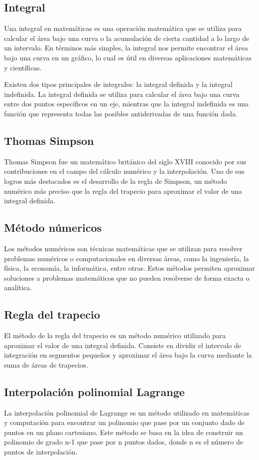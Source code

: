 \subsection{Integral}
Una integral en matemáticas es una operación matemática que se utiliza para calcular el área bajo una curva o la acumulación de cierta cantidad a lo largo de un intervalo. En términos más simples, la integral nos permite encontrar el área bajo una curva en un gráfico, lo cual es útil en diversas aplicaciones matemáticas y científicas.

Existen dos tipos principales de integrales: la integral definida y la integral indefinida. La integral definida se utiliza para calcular el área bajo una curva entre dos puntos específicos en un eje, mientras que la integral indefinida es una función que representa todas las posibles antiderivadas de una función dada.


\subsection{Thomas Simpson}
Thomas Simpson fue un matemático británico del siglo XVIII conocido por sus contribuciones en el campo del cálculo numérico y la interpolación. Uno de sus logros más destacados es el desarrollo de la regla de Simpson, un método numérico más preciso que la regla del trapecio para aproximar el valor de una integral definida.

\subsection{Método númericos}
Los métodos numéricos son técnicas matemáticas que se utilizan para resolver problemas numéricos o computacionales en diversas áreas, como la ingeniería, la física, la economía, la informática, entre otras. Estos métodos permiten aproximar soluciones a problemas matemáticos que no pueden resolverse de forma exacta o analítica.

\subsection{Regla del trapecio}
El método de la regla del trapecio es un método numérico utilizado para aproximar el valor de una integral definida. Consiste en dividir el intervalo de integración en segmentos pequeños y aproximar el área bajo la curva mediante la suma de áreas de trapecios.

\subsection{Interpolación polinomial Lagrange}
La interpolación polinomial de Lagrange es un método utilizado en matemáticas y computación para encontrar un polinomio que pase por un conjunto dado de puntos en un plano cartesiano. Este método se basa en la idea de construir un polinomio de grado n-1 que pase por n puntos dados, donde n es el número de puntos de interpolación.

